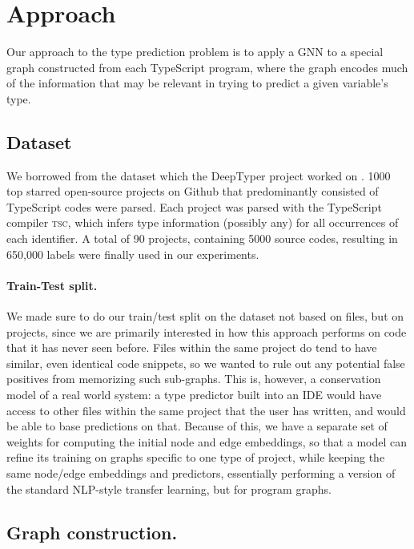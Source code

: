 \section{Approach}
\label{sec:approach}

Our approach to the type prediction problem is to apply a GNN to a special graph constructed from each TypeScript program, where the graph encodes much of the information that may be relevant in trying to predict a given variable's type.

\subsection{Dataset}
\label{sec:dataset}
We borrowed from the dataset which the DeepTyper project worked on \cite{hellendoorn2018deep}. 1000 top starred open-source projects on Github that predominantly consisted of TypeScript codes were parsed. Each project was parsed with the TypeScript compiler \textsc{tsc}, which infers type information (possibly any) for all occurrences of each identifier. A total of 90 projects, containing 5000 source codes, resulting in 650,000 labels were finally used in our experiments.

\paragraph{Train-Test split.}

We made sure to do our train/test split on the dataset not based on files, but on projects, since we are primarily interested in how this approach performs on code that it has never seen before.
Files within the same project do tend to have similar, even identical code snippets, so we wanted to rule out any potential false positives from memorizing such sub-graphs.
This is, however, a conservation model of a real world system: a type predictor built into an IDE would have access to other files within the same project that the user has written, and would be able to base predictions on that.
Because of this, we have a separate set of weights for computing the initial node and edge embeddings, so that a model can refine its training on graphs specific to one type of project, while keeping the same node/edge embeddings and predictors, essentially performing a version of the standard NLP-style transfer learning, but for program graphs.

\subsection{Graph construction.}

